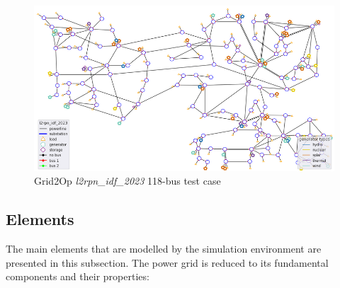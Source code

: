 \begin{figure}
	\centering
	\includegraphics[width=0.85\linewidth]{./figures/grid2op-graph.png}
	\caption{Grid2Op \textit{l2rpn\_idf\_2023} 118-bus test case \cite{rtefranceGrid2OpDocumentation}}
	\label{fig:grid2op-graph}
\end{figure}


\subsection{Elements}

The main elements that are modelled by the simulation environment are presented in this subsection. The power grid is reduced to its fundamental components and their properties:

